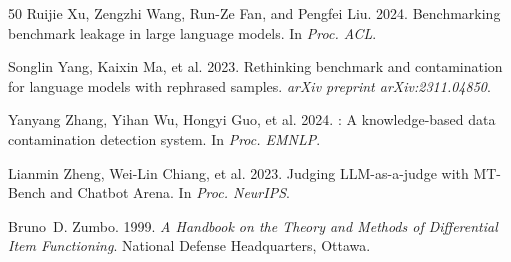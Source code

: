 \documentclass[11pt,a4paper]{article}
\begin{document}
\begin{thebibliography}{50}
Ruijie Xu, Zengzhi Wang, Run-Ze Fan, and Pengfei Liu. 2024.
\newblock Benchmarking benchmark leakage in large language models.
\newblock In \emph{Proc. ACL}.

Songlin Yang, Kaixin Ma, et al. 2023.
\newblock Rethinking benchmark and contamination for language models with rephrased samples.
\newblock \emph{arXiv preprint arXiv:2311.04850}.

Yanyang Zhang, Yihan Wu, Hongyi Guo, et al. 2024.
: A knowledge-based data contamination detection system.
\newblock In \emph{Proc. EMNLP}.

Lianmin Zheng, Wei-Lin Chiang, et al. 2023.
\newblock Judging {LLM}-as-a-judge with {MT-Bench} and {Chatbot Arena}.
\newblock In \emph{Proc. NeurIPS}.

Bruno~D. Zumbo. 1999.
\newblock \emph{A Handbook on the Theory and Methods of Differential Item Functioning}.
\newblock National Defense Headquarters, Ottawa.

\end{thebibliography}
\end{document}
